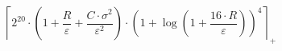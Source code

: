 \[\left\lceil 2^{20} \cdot \left(1 + \frac{R}{\varepsilon} + \frac{C \cdot \sigma^{2}}{\varepsilon^{2}}\right) \cdot \left(1 + \log\left(1 + \frac{16 \cdot R}{\varepsilon}\right)\right)^{4} \right\rceil_{+}\]
